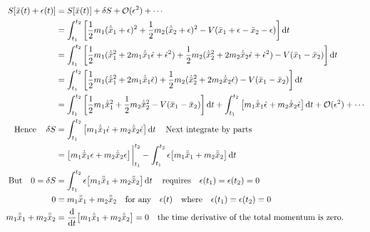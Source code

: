 \documentclass{article}
\begin{document}
\begin{align*}
    S[\bar{x}(t)+\epsilon(t)]                & =S[\bar{x}(t)]+\var{S}+\mathcal{O}(\epsilon^2)+\cdots                                                                                                                                                                                                      \\
                                             & = \int_{t_1}^{t_2}\bqty{\frac{1}{2}m_1(\dot{\bar{x}}_1+{\epsilon})^2+\frac{1}{2}m_2(\dot{\bar{x}}_2+{\epsilon})^2-V(\bar{x}_1 +\epsilon -\bar{x}_2 -\epsilon)}\dd{t}                                                                                       \\
                                             & =\int_{t_1}^{t_2}\bqty{\frac{1}{2}m_1(\dot{\bar{x}}_1^2+2m_1\dot{\bar{x}}_1 \dot{\epsilon}+\dot{\epsilon}^2)+\frac{1}{2}m_2(\dot{\bar{x}}_2^2+2m_2 \dot{\bar{x}}_2\dot{\epsilon}+\dot{\epsilon}^2)-V(\bar{x}_1  -\bar{x}_2 )}\dd{t}                        \\
                                             & =\int_{t_1}^{t_2}\bqty{\frac{1}{2}m_1(\dot{\bar{x}}_1^2+2m_1\dot{\bar{x}}_1 \dot{\epsilon})+\frac{1}{2}m_2(\dot{\bar{x}}_2^2+2m_2 \dot{\bar{x}}_2\dot{\epsilon})-V(\bar{x}_1  -\bar{x}_2 )}\dd{t}                                                          \\
                                             & =\int_{t_1}^{t_2}\bqty{\frac{1}{2}m_1 \dot{\bar{x}}_1^2+\frac{1}{2}m_2 \dot{\bar{x}}_2^2-V(\bar{x}_1  -\bar{x}_2 )}\dd{t}+\int_{t_1}^{t_2}\bqty{m_1\dot{\bar{x}}_1 \dot{\epsilon}+m_2 \dot{\bar{x}}_2 \dot{\epsilon}}\dd{t}+\mathcal{O}(\epsilon^2)+\cdots \\
    \qq*{Hence}\var{S}                       & =\int_{t_1}^{t_2}\bqty{m_1\dot{\bar{x}}_1 \dot{\epsilon}+m_2 \dot{\bar{x}}_2 \dot{\epsilon}}\dd{t} \qq{Next integrate by parts}                                                                                                                            \\
                                             & =\bqty{m_1 \dot{\bar{x}}_1 \epsilon + m_2 \dot{\bar{x}}_2 \epsilon         }\eval_{t_1}^{t_2}    -      \int_{t_1}^{t_2}   \epsilon \bqty{m_1\ddot{\bar{x}}_1 +m_2 \ddot{\bar{x}}_2 }\dd{t}                                                                \\
    \qq*{But}0=\var{S}                       & =\int_{t_1}^{t_2}\epsilon\bqty{m_1\ddot{\bar{x}}_1+m_2 \ddot{\bar{x}}_2}\dd{t}              \qq{requires}   \epsilon(t_1)=\epsilon(t_2)     =0                                                                                                             \\
    0                                        & =m_1\ddot{\bar{x}}_1+m_2 \ddot{\bar{x}}_2\qq{for any}\epsilon(t)\qq{where} \epsilon(t_1)=\epsilon(t_2)=0                                                                                                                                                   \\
    m_1\ddot{\bar{x}}_1+m_2 \ddot{\bar{x}}_2 & =\dv{t}\bqty{m_1\dot{\bar{x}}_1+m_2 \dot{\bar{x}}_2}=0 \qq{the time derivative of the total momentum is zero.}
\end{align*}
\end{document}
